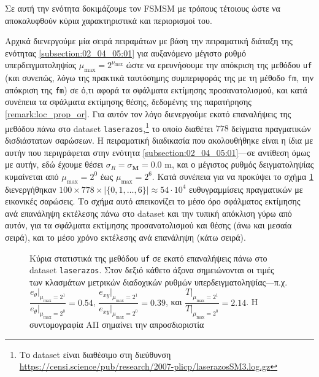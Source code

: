 Σε αυτή την ενότητα δοκιμάζουμε τον FSMSM με τρόπους τέτοιους ώστε να
αποκαλυφθούν κύρια χαρακτηριστικά και περιορισμοί του.

Αρχικά διενεργούμε μία σειρά πειραμάτων με βάση την πειραματική διάταξη της
ενότητας \ref{subsection:02_04_05:01} για αυξανόμενο μέγιστο ρυθμό
υπερδειγματοληψίας $\mu_{\max} = 2^{\nu_{\max}}$ ώστε να ερευνήσουμε την
απόκριση της μεθόδου \texttt{uf} (και συνεπώς, λόγω της πρακτικά ταυτόσημης
συμπεριφοράς της με τη μέθοδο \texttt{fm}, την απόκριση της \texttt{fm}) σε
ό,τι αφορά τα σφάλματα εκτίμησης προσανατολισμού, και κατά συνέπεια τα σφάλματα
εκτίμησης θέσης, δεδομένης της παρατήρησης \ref{remark:loc_prop_or}. Για αυτόν
τον λόγο διενεργούμε εκατό επαναλήψεις της μεθόδου πάνω στο dataset
\texttt{laserazos},\footnote{Το dataset είναι διαθέσιμο στη διεύθυνση
\url{https://censi.science/pub/research/2007-plicp/laserazosSM3.log.gz}} το
οποίο διαθέτει $778$ δείγματα πραγματικών δισδιάστατων σαρώσεων. Η πειραματική
διαδικασία που ακολουθήθηκε είναι η ίδια με αυτήν που περιγράφεται στην ενότητα
\ref{subsection:02_04_05:01}---σε αντίθεση όμως με αυτήν, εδώ έχουμε θέσει
$\sigma_R = \sigma_{\bm{M}} = 0.0$ m, και ο μέγιστος ρυθμός δειγματοληψίας
κυμαίνεται από $\mu_{\max} = 2^0$ έως $\mu_{\max} = 2^6$. Κατά συνέπεια για να
προκύψει το σχήμα \ref{fig:02_04_06:01} διενεργήθηκαν $100 \times 778 \times
|\{0,1,\dots,6\}| \approx 54\cdot 10^4$ ευθυγραμμίσεις πραγματικών με εικονικές
σαρώσεις. Το σχήμα αυτό απεικονίζει το μέσο όρο σφάλματος εκτίμησης ανά
επανάληψη εκτέλεσης πάνω στο dataset και την τυπική απόκλιση γύρω από αυτόν,
για τα σφάλματα εκτίμησης προσανατολισμού και θέσης (άνω και μεσαία σειρά), και
το μέσο χρόνο εκτέλεσης ανά επανάληψη (κάτω σειρά).

\begin{figure}[h]\centering
  
  \caption{\small Κύρια στατιστικά της μεθόδου \texttt{uf} σε εκατό επαναλήψεις
           πάνω στο dataset \texttt{laserazos}. Στον δεξιό κάθετο άξονα
           σημειώνονται οι τιμές των κλασμάτων μετρικών διαδοχικών ρυθμών
           υπερδειγματοληψίας---π.χ.
           $\dfrac{e_{\theta}|_{\mu_{\max} = 2^1}}{e_{\theta}|_{\mu_{\max} = 2^0}} = 0.54$,
           $\dfrac{e_{xy}|_{\mu_{\max} = 2^1}}{e_{xy}|_{\mu_{\max} = 2^0}} = 0.39$,
           και $\dfrac{T|_{\mu_{\max} = 2^1}}{T|_{\mu_{\max} = 2^0}} = 2.14$. Η
           συντομογραφία ΑΠ σημαίνει την απροσδιοριστία}
  \label{fig:02_04_06:01}
\end{figure}

